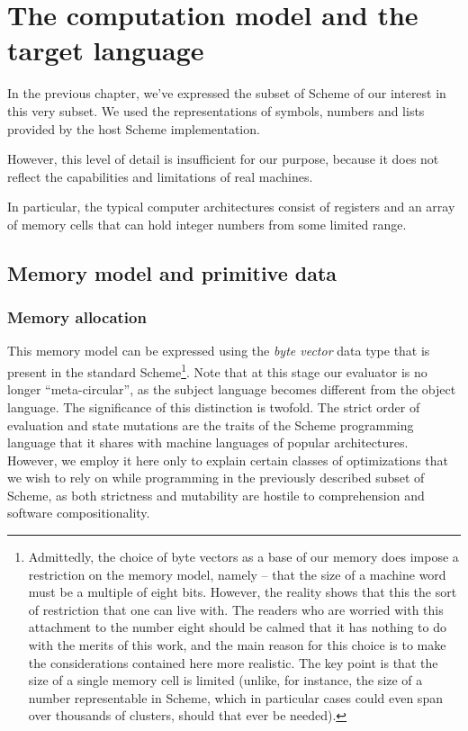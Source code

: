 \chapter{The computation model and the target language}

In the previous chapter, we've expressed the subset of Scheme of our
interest in this very subset. We used the representations of symbols,
numbers and lists provided by the host Scheme implementation.

However, this level of detail is insufficient for our purpose, because
it does not reflect the capabilities and limitations of real machines.

In particular, the typical computer architectures consist of registers
and an array of memory cells that can hold integer numbers from some
limited range.

\section{Memory model and primitive data}

\subsection{Memory allocation}

This memory model can be expressed using the \emph{byte vector} data type
that is present in the standard Scheme\footnote{
  Admittedly, the choice of byte vectors as a base of our memory
  does impose a restriction on the memory model, namely -- that
  the size of a machine word must be a multiple of eight bits.
  However, the reality shows that this the sort of restriction
  that one can live with.
  The readers who are worried with this attachment to the number
  eight should be calmed that it has nothing to do with the merits
  of this work, and the main reason for this choice is to make
  the considerations contained here more realistic. The key point
  is that the size of a single memory cell is limited (unlike,
  for instance, the size of a number representable in Scheme, which
  in particular cases could even span over thousands of clusters,
  should that ever be needed).
}. Note that at this stage
our evaluator is no longer ``meta-circular'', as the subject language
becomes different from the object language. The significance of this
distinction is twofold. The strict order of evaluation and state
mutations are the traits of the Scheme programming language that
it shares with machine languages of popular architectures. However, we
employ it here only to explain certain classes of optimizations
that we wish to rely on while programming in the previously described
subset of Scheme, as both strictness and mutability are hostile
to comprehension and software compositionality.

